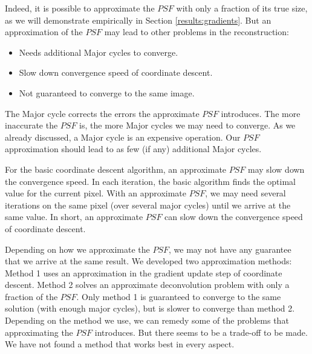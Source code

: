 Indeed, it is possible to approximate the $PSF$ with only a fraction of its true size, as we will demonstrate empirically in Section \ref{results:gradients}. But an approximation of the $PSF$ may lead to other problems in the reconstruction:
\begin{itemize}
	\item Needs additional Major cycles to converge.
	\item Slow down convergence speed of coordinate descent.
	\item Not guaranteed to converge to the same image.
\end{itemize}

The Major cycle corrects the errors the approximate $PSF$ introduces. The more inaccurate the $PSF$ is, the more Major cycles we may need to converge. As we already discussed, a Major cycle is an expensive operation. Our $PSF$ approximation should lead to as few (if any) additional Major cycles.

For the basic coordinate descent algorithm, an approximate $PSF$ may slow down the convergence speed. In each iteration, the basic algorithm finds the optimal value for the current pixel. With an approximate $PSF$, we may need several iterations on the same pixel (over several major cycles) until we arrive at the same value. In short, an approximate $PSF$ can slow down the convergence speed of coordinate descent.

Depending on how we approximate the $PSF$, we may not have any guarantee that we arrive at the same result. We developed two approximation methods: Method 1 uses an approximation in the gradient update step of coordinate descent. Method 2 solves an approximate deconvolution problem with only a fraction of the $PSF$. Only method 1 is guaranteed to converge to the same solution (with enough major cycles), but is slower to converge than method 2. Depending on the method we use, we can remedy some of the problems that approximating the $PSF$ introduces. But there seems to be a trade-off to be made. We have not found a method that works best in every aspect.

